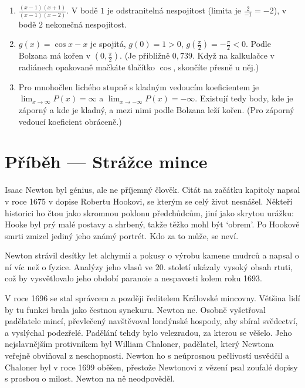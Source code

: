 \begin{solution}
  \begin{enumerate}[label=(\alph*)]
    \item $\frac{(x - 1)(x + 1)}{(x - 1)(x - 2)}$. V bodě $1$ je odstranitelná nespojitost (limita je $\frac{2}{-1} = -2$), v bodě $2$ nekonečná nespojitost.
    \item $g(x) = \cos x - x$ je spojitá, $g(0) = 1 > 0$, $g\left(\frac{\pi}{2}\right) = -\frac{\pi}{2} < 0$. Podle Bolzana má kořen v $\left(0, \frac{\pi}{2}\right)$. (Je přibližně $0{,}739$. Když na kalkulačce v radiánech opakovaně mačkáte tlačítko $\cos$, skončíte přesně u něj.)
    \item Pro mnohočlen lichého stupně s kladným vedoucím koeficientem je $\lim_{x\to\infty} P(x) = \infty$ a $\lim_{x\to-\infty} P(x) = -\infty$. Existují tedy body, kde je záporný a kde je kladný, a mezi nimi podle Bolzana leží kořen. (Pro záporný vedoucí koeficient obráceně.)
  \end{enumerate}
\end{solution}

\section{Příběh --- Strážce mince}

Isaac Newton byl génius, ale ne příjemný člověk. Citát na začátku kapitoly napsal v roce 1675 v dopise Robertu Hookovi, se kterým se celý život nesnášel. Někteří historici ho čtou jako skromnou poklonu předchůdcům, jiní jako skrytou urážku: Hooke byl prý malé postavy a shrbený, takže těžko mohl být `obrem'. Po Hookově smrti zmizel jediný jeho známý portrét. Kdo za to může, se neví.

Newton strávil desítky let alchymií a pokusy o výrobu kamene mudrců a napsal o ní víc než o fyzice. Analýzy jeho vlasů ve 20. století ukázaly vysoký obsah rtuti, což by vysvětlovalo jeho období paranoie a nespavosti kolem roku 1693.

V roce 1696 se stal správcem a později ředitelem Královské mincovny. Většina lidí by tu funkci brala jako čestnou synekuru. Newton ne. Osobně vyšetřoval padělatele mincí, převlečený navštěvoval londýnské hospody, aby sbíral svědectví, a vyslýchal podezřelé. Padělání tehdy bylo velezradou, za kterou se věšelo. Jeho nejslavnějším protivníkem byl William Chaloner, padělatel, který Newtona veřejně obviňoval z neschopnosti. Newton ho s neúprosnou pečlivostí usvědčil a Chaloner byl v roce 1699 oběšen, přestože Newtonovi z vězení psal zoufalé dopisy s prosbou o milost. Newton na ně neodpověděl.

